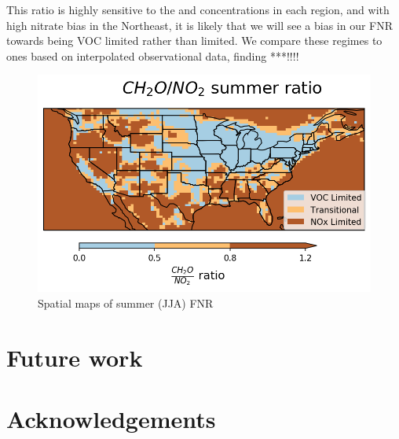 \documentclass[12]{article}
\begin{document}
This ratio is highly sensitive to the  and  concentrations in each region, and with high nitrate bias in the Northeast, it is likely that we will see a bias in our FNR towards being VOC limited rather than  limited. We compare these regimes to ones based on interpolated observational data, finding ***!!!! 

\begin{figure}
    \centering
    \includegraphics[scale=0.4]{ego_nonuclear_project/Figures/summer_regime_national_ratio.png}
    \caption{Spatial maps of summer (JJA) FNR} 
    \label{fig:summer_FNR}
\end{figure}

\section{Future work}

\section{Acknowledgements}


\pagebreak


\end{document}
